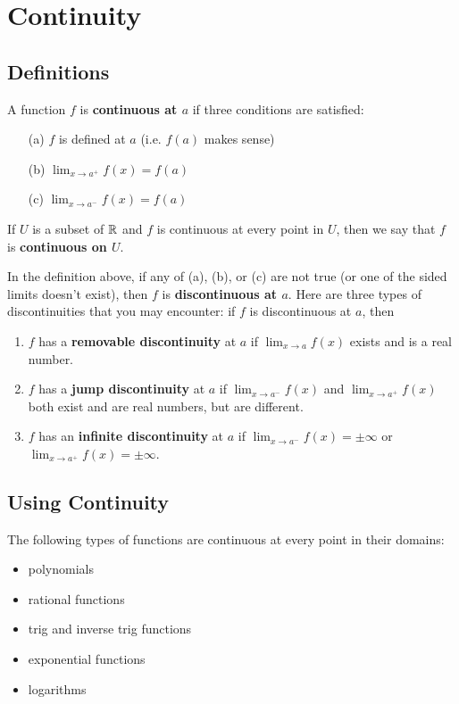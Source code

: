 \section{Continuity}

\subsection{Definitions}

A function $f$ is \textbf{continuous at $a$} if three conditions are satisfied:
\begin{enumerate}
\item[(a)] $f$ is defined at $a$ (i.e. $f(a)$ makes sense)
\item[(b)] $\displaystyle\lim_{x\to a^+} f(x)= f(a)$
\item[(c)] $\displaystyle\lim_{x\to a^-} f(x)= f(a)$
\end{enumerate}

If $U$ is a subset of $\mathbb{R}$ and $f$ is continuous at every point in $U$, then we say that $f$ is \textbf{continuous on $U$}.

In the definition above, if any of (a), (b), or (c) are not true (or one of the sided limits doesn't exist), then $f$ is \textbf{discontinuous at $a$}. Here are three types of discontinuities that you may encounter: if $f$ is discontinuous at $a$, then
\begin{enumerate}
\item $f$ has a \textbf{removable discontinuity} at $a$ if $\displaystyle\lim _{x \to a} f(x)$ exists and is a real number.
\item $f$ has a \textbf{jump discontinuity} at $a$ if $\displaystyle\lim _{x \to a^{-}} f(x)$ and $\displaystyle\lim _{x \to a^{+}} f(x)$ both exist and are real numbers, but are different.
\item $f$ has an \textbf{infinite discontinuity} at $a$ if $\displaystyle\lim _{x \to a^{-}} f(x)=\pm \infty$ or $\displaystyle\lim _{x \to a^{+}} f(x)=\pm \infty$.
\end{enumerate}

\subsection{Using Continuity}

The following types of functions are continuous at every point in their domains:
\begin{itemize}
\item polynomials
\item rational functions
\item trig and inverse trig functions
\item exponential functions
\item logarithms
\end{itemize}

